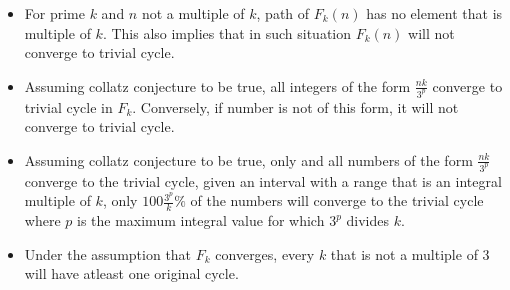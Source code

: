 \documentclass[12pt]{article} %
\begin{document}
\begin{itemize}
   \item For prime $k$ and $n$ not a multiple of $k$, path of $F_k(n)$ has no element that is multiple of $k$. This also implies that in such situation $F_k(n)$ will not converge to trivial cycle. 
   
   \item Assuming collatz conjecture to be true, all integers of the form $\frac{nk}{3^p}$ converge to trivial cycle in $F_k$. Conversely, if number is not of this form, it will not converge to trivial cycle.
   
   \item Assuming collatz conjecture to be true, only and all numbers of the form $\frac{nk}{3^{p}}$ converge to the trivial cycle, given an interval with a range that is an integral multiple of $k$, only $100\frac{3^p}{k}\%$ of the numbers will converge to the trivial cycle where $p$ is the maximum integral value for which $3^p$ divides $k$. 
    
    \item Under the assumption that $F_k$ converges, every $k$ that is not a multiple of $3$ will have atleast one original cycle.
\end{itemize}
 
\end{document}
